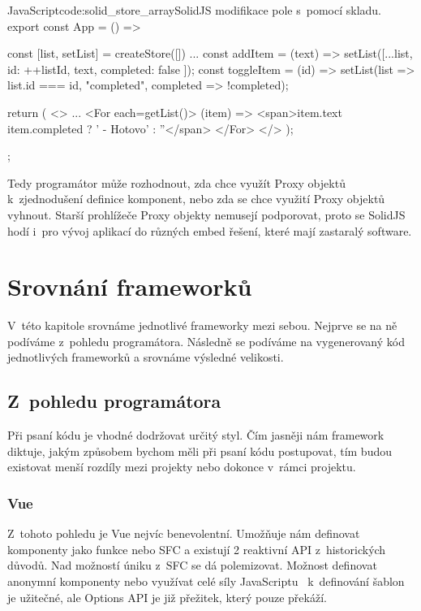 \documentclass[
  master,
  program=ainf,
  printversion,
  tables=false,
  sourcecodes,
  glossaries,
  index
]{kidiplom}
\begin{document}
\begin{absolutelynopagebreak}
  \begin{kicode}{JavaScript}{code:solid_store_array}{SolidJS modifikace pole s~pomocí skladu.}
    export const App = () => {
      const [list, setList] = createStore([])
      ...
      const addItem = (text) => {
        setList([...list, { id: ++listId, text, completed: false }]);
      }
      const toggleItem = (id) => {
        setList(list => list.id === id, "completed", completed => !completed);
      }

      return (
        <>
          ...
          <For each={getList()}>
            {(item) => {<span>{item.text} {item.completed ? ' - Hotovo' : ''</span>} }}
          </For>
        </>
      );
    };
\end{kicode}
\end{absolutelynopagebreak}

Tedy programátor může rozhodnout, zda chce využít Proxy objektů k~zjednodušení definice komponent, nebo zda
se chce využití Proxy objektů vyhnout. Starší prohlížeče Proxy objekty nemusejí podporovat, proto se SolidJS
hodí i~pro vývoj aplikací do různých embed řešení, které mají zastaralý software.

\newpage
\section{Srovnání frameworků}
V~této kapitole srovnáme jednotlivé frameworky mezi sebou. Nejprve se na ně podíváme z~pohledu programátora.
Následně se podíváme na vygenerovaný kód jednotlivých frameworků a srovnáme výsledné velikosti.

\subsection{Z~pohledu programátora}
Při psaní kódu je vhodné dodržovat určitý styl. Čím jasněji nám framework diktuje, jakým způsobem bychom
měli při psaní kódu postupovat, tím budou existovat menší rozdíly mezi projekty nebo dokonce v~rámci projektu.

\subsubsection{Vue}
Z~tohoto pohledu je Vue nejvíc benevolentní. Umožňuje nám definovat komponenty jako funkce nebo SFC a existují
2 reaktivní API z~historických důvodů. Nad možností úniku z~SFC se dá polemizovat. Možnost definovat anonymní
komponenty nebo využívat celé síly JavaScriptu~\cite{js} k~definování šablon je užitečné, ale Options API je již přežitek,
který pouze překáží. 
\end{document}

